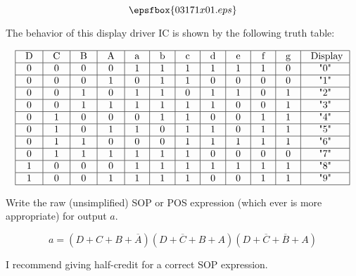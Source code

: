 

$$\epsfbox{03171x01.eps}$$

The behavior of this display driver IC is shown by the following truth table:


$$\vbox{\offinterlineskip
\halign{\strut
\vrule \quad\hfil # \ \hfil & 
\vrule \quad\hfil # \ \hfil & 
\vrule \quad\hfil # \ \hfil & 
\vrule \quad\hfil # \ \hfil & 
\vrule \quad\hfil # \ \hfil & 
\vrule \quad\hfil # \ \hfil & 
\vrule \quad\hfil # \ \hfil & 
\vrule \quad\hfil # \ \hfil & 
\vrule \quad\hfil # \ \hfil & 
\vrule \quad\hfil # \ \hfil & 
\vrule \quad\hfil # \ \hfil & 
\vrule \quad\hfil # \ \hfil \vrule \cr
\noalign{\hrule}
%
D & C & B & A & a & b & c & d & e & f & g & Display\cr
%
\noalign{\hrule}
%
0 & 0 & 0 & 0 & 1 & 1 & 1 & 1 & 1 & 1 & 0 & "0" \cr
%
\noalign{\hrule}
%
0 & 0 & 0 & 1 & 0 & 1 & 1 & 0 & 0 & 0 & 0 & "1" \cr
%
\noalign{\hrule}
%
0 & 0 & 1 & 0 & 1 & 1 & 0 & 1 & 1 & 0 & 1 & "2" \cr
%
\noalign{\hrule}
%
0 & 0 & 1 & 1 & 1 & 1 & 1 & 1 & 0 & 0 & 1 & "3" \cr
%
\noalign{\hrule}
%
0 & 1 & 0 & 0 & 0 & 1 & 1 & 0 & 0 & 1 & 1 & "4" \cr
%
\noalign{\hrule}
%
0 & 1 & 0 & 1 & 1 & 0 & 1 & 1 & 0 & 1 & 1 & "5" \cr
%
\noalign{\hrule}
%
0 & 1 & 1 & 0 & 0 & 0 & 1 & 1 & 1 & 1 & 1 & "6" \cr
%
\noalign{\hrule}
%
0 & 1 & 1 & 1 & 1 & 1 & 1 & 0 & 0 & 0 & 0 & "7" \cr
%
\noalign{\hrule}
%
1 & 0 & 0 & 0 & 1 & 1 & 1 & 1 & 1 & 1 & 1 & "8" \cr
%
\noalign{\hrule}
%
1 & 0 & 0 & 1 & 1 & 1 & 1 & 0 & 0 & 1 & 1 & "9" \cr
%
\noalign{\hrule}
} %
}$$ %

Write the raw (unsimplified) SOP or POS expression (which ever is more appropriate) for output $a$.







$$a = (D + C + B + \overline{A})(D + \overline{C} + B + A)(D + \overline{C} + \overline{B} + A)$$

I recommend giving half-credit for a correct SOP expression.

